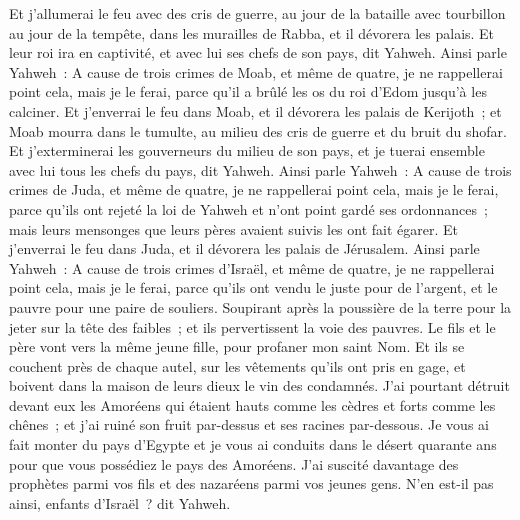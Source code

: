 \begin{multicols}{2}
Et j'allumerai le feu avec des cris de guerre, au jour de la bataille avec tourbillon au jour de la tempête, dans les murailles de Rabba, et il dévorera les palais. 
Et leur roi ira en captivité, et avec lui ses chefs de son pays, dit Yahweh.
\VerseOne{}Ainsi parle Yahweh~: A cause de trois crimes de Moab, et même de quatre, je ne rappellerai point cela, mais je le ferai, parce qu'il a brûlé les os du roi d'Edom jusqu'à les calciner.
Et j'enverrai le feu dans Moab, et il dévorera les palais de Kerijoth~; et Moab mourra dans le tumulte, au milieu des cris de guerre et du bruit du shofar.
Et j'exterminerai les gouverneurs du milieu de son pays, et je tuerai ensemble avec lui tous les chefs du pays, dit Yahweh.
Ainsi parle Yahweh~: A cause de trois crimes de Juda, et même de quatre, je ne rappellerai point cela, mais je le ferai, parce qu'ils ont rejeté la loi de Yahweh et n'ont point gardé ses ordonnances~; mais leurs mensonges que leurs pères avaient suivis les ont fait égarer. 
Et j'enverrai le feu dans Juda, et il dévorera les palais de Jérusalem.
Ainsi parle Yahweh~: A cause de trois crimes d'Israël, et même de quatre, je ne rappellerai point cela, mais je le ferai, parce qu'ils ont vendu le juste pour de l'argent, et le pauvre pour une paire de souliers.
Soupirant après la poussière de la terre pour la jeter sur la tête des faibles~; et ils pervertissent la voie des pauvres. Le fils et le père vont vers la même jeune fille, pour profaner mon saint Nom.
Et ils se couchent près de chaque autel, sur les vêtements qu'ils ont pris en gage, et boivent dans la maison de leurs dieux le vin des condamnés.
J'ai pourtant détruit devant eux les Amoréens qui étaient hauts comme les cèdres et forts comme les chênes~; et j'ai ruiné son fruit par-dessus et ses racines par-dessous.
Je vous ai fait monter du pays d'Egypte et je vous ai conduits dans le désert quarante ans pour que vous possédiez le pays des Amoréens.
J'ai suscité davantage des prophètes parmi vos fils et des nazaréens parmi vos jeunes gens. N'en est-il pas ainsi, enfants d'Israël~? dit Yahweh.

\end{multicols}
